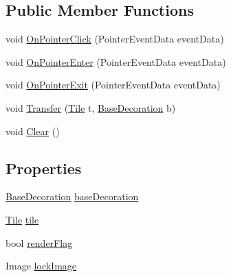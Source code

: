 \subsection*{Public Member Functions}
\begin{DoxyCompactItemize}
\item 
void \mbox{\hyperlink{class_decoration_behaviour_a94a1b5e492f096e3f121d05105e16c37}{On\+Pointer\+Click}} (Pointer\+Event\+Data event\+Data)
\item 
void \mbox{\hyperlink{class_decoration_behaviour_abc5e3d4f07a6da052203565037d8b535}{On\+Pointer\+Enter}} (Pointer\+Event\+Data event\+Data)
\item 
void \mbox{\hyperlink{class_decoration_behaviour_a7c33b0d7ccac7ff55a4acb49b6fa3c83}{On\+Pointer\+Exit}} (Pointer\+Event\+Data event\+Data)
\item 
void \mbox{\hyperlink{class_decoration_behaviour_a6f5bef52b05859295759318878ec9a1c}{Transfer}} (\mbox{\hyperlink{class_tile}{Tile}} t, \mbox{\hyperlink{class_base_decoration}{Base\+Decoration}} b)
\item 
void \mbox{\hyperlink{class_decoration_behaviour_aab39ad5614d361801ffc9168a830c3d7}{Clear}} ()
\end{DoxyCompactItemize}
\subsection*{Properties}
\begin{DoxyCompactItemize}
\item 
\mbox{\hyperlink{class_base_decoration}{Base\+Decoration}} \mbox{\hyperlink{class_decoration_behaviour_a2d21a94b61e9200465d4508e0913e51d}{base\+Decoration}}
\item 
\mbox{\hyperlink{class_tile}{Tile}} \mbox{\hyperlink{class_decoration_behaviour_ae1f553f396cbb145d7e5c8724c0d24a0}{tile}}
\item 
bool \mbox{\hyperlink{class_decoration_behaviour_a683b77b56bcac3f59bde61021b1592c0}{render\+Flag}}
\item 
Image \mbox{\hyperlink{class_decoration_behaviour_afdf4d387bacdf9075944663410c189f0}{lock\+Image}}
\end{DoxyCompactItemize}


